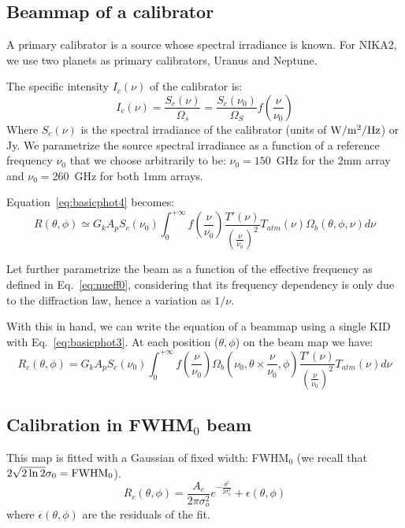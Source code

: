 \subsection{Beammap of a calibrator}

A primary calibrator is a source whose spectral irradiance is
known. For NIKA2, we use two planets as primary calibrators, Uranus
and Neptune.

The specific intensity $I_{c}(\nu)$ of the
calibrator is:
\begin{equation}
I_{c}(\nu) =  \frac{S_{c}(\nu)}{\Omega_{s}} =\frac{ S_{c}
(\nu_{0})}{\Omega_{S}} f(\frac{\nu}{\nu_{0}})  
\end{equation}
Where $S_{c}(\nu)$ is the spectral irradiance of the calibrator (units
of $\rm W/m^{2}/Hz$) or Jy. We parametrize the source spectral irradiance
as a function of a reference frequency $\nu_{0}$ that we choose
arbitrarily to be: $\nu_{0} = 150$~GHz for the 2mm array and $\nu_{0}
= 260$~GHz for both 1mm arrays. 


Equation~\ref{eq:basicphot4} becomes:
\begin{equation}
R(\theta, \phi) \simeq G_{k}  A_{p}  S_{c} (\nu_{0}) \int_{0}^{+\infty} f(\frac{\nu}{\nu_{0}})  
\frac{T'(\nu)}{\left(\frac{\nu}{\nu_{0}}\right)^{2}} T_{atm}(\nu) \Omega_{b} (\theta, \phi, \nu)  d\nu 
\label{eq:basicphot5}
\end{equation}

Let further parametrize the beam as a function
of the effective frequency as defined in Eq.~\ref{eq:nueff0},
considering that its frequency dependency is only due to the diffraction law,
hence a variation as $1/\nu$.

With this in hand, we can write the equation of a beammap using a
single KID with Eq.~\ref{eq:basicphot3}. At each position ($\theta,
\phi$) on the beam map we have:
\begin{equation}
R_{c}(\theta, \phi) =  G_{k} A_{p} S_{c} (\nu_{0})  \int_{0}^{+\infty}
f(\frac{\nu}{\nu_{0}}) \Omega_{b}(\nu_{0}, \theta \times \frac{\nu}{\nu_{0}},
\phi) \frac{T'(\nu)}{\left(\frac{\nu}{\nu_{0}}\right)^{2}}
T_{atm}(\nu) d\nu
\label{eq:beammap}
\end{equation}

\subsection{Calibration in FWHM$_{0}$ beam}
\label{ap:flux_density_equation}

This map is fitted with a Gaussian of fixed width: FWHM$_{0}$ (we
recall that $2 \sqrt{2\ln{2}} \sigma_{0} =  {\rm FWHM}_{0}$).
\begin{equation} 
R_{c}(\theta, \phi) = \frac{A_{c}}{2 \pi \sigma_{o}^{2}}
e^{-\frac{\theta^{2}}{2\sigma_{0}^{2}}}  + \epsilon(\theta, \phi)
\end{equation}
where $\epsilon(\theta, \phi)$ are the residuals of the fit.

